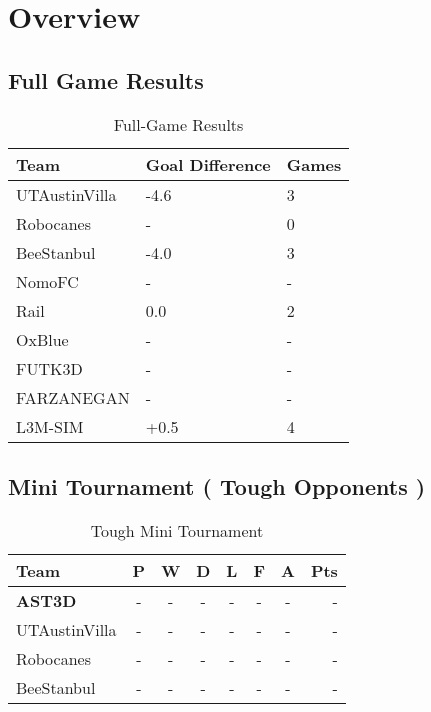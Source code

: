 \section{Overview}

\subsection{Full Game Results}

\begin{table}
\begin{center}
    \begin{tabular}{ | l | l | l | }
    \hline
    Team & Goal Difference & Games   \\ \hline
    UTAustinVilla 	& -4.6 			& 3 			\\ \hline	
    Robocanes 		& -				& 0 			\\ \hline
    BeeStanbul		& -4.0			& 3				\\ \hline
    NomoFC 			& - 			& - 			\\ \hline
    Rail 			& 0.0 			& 2 			\\ \hline
    OxBlue 			& - 			& - 			\\ \hline
    FUTK3D 			& - 			& - 			\\ \hline
    FARZANEGAN 		& - 			& - 			\\ \hline
    L3M-SIM			& +0.5 			& 4 			\\     
    \hline
    \end{tabular}
\end{center}
\label{GameResults}
\caption{Full-Game Results}
\end{table}

\subsection{Mini Tournament ( Tough Opponents )}
\begin{table}
\begin{center}
\begin{tabular}{l*{6}{c}r}
Team              & P & W & D & L & F  & A & Pts \\ \hline
\textbf{AST3D} & - & - & - & - & - & - & -  \\
UTAustinVilla            & - & - & - & - &  - & - &  -  \\
Robocanes           & - & - & - & - &  - & - &  -  \\
BeeStanbul     & - & - & - & - &  - & - &  - \\
\end{tabular}
\end{center}
\label{ToughTournament}
\caption{Tough Mini Tournament}
\end{table}

